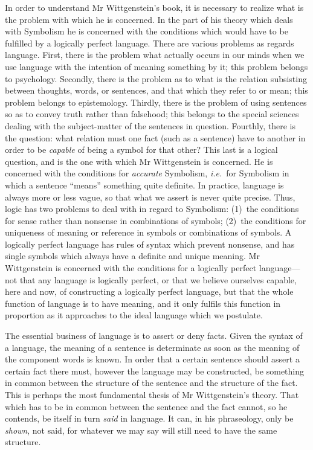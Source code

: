\documentclass[12pt,oneside]{book}[2007/10/19]
\newcommand{\idEst}{\textit{i.e.}}
\begin{document}
In order to understand Mr Wittgenstein's book, it is
necessary to realize what is the problem with which he is
concerned. In the part of his theory which deals with
Symbolism he is concerned with the conditions which
would have to be fulfilled by a logically perfect language.
There are various problems as regards language. First,
there is the problem what actually occurs in our minds
when we use language with the intention of meaning
something by it; this problem belongs to psychology.
Secondly, there is the problem as to what is the relation
subsisting between thoughts, words, or sentences, and that
which they refer to or mean; this problem belongs to
epistemology. Thirdly, there is the problem of using
sentences so as to convey truth rather than falsehood;
this belongs to the special sciences dealing with the
subject-matter of the sentences in question. Fourthly,
there is the question: what relation must one fact (such
as a sentence) have to another in order to be \emph{capable}
of being a symbol for that other? This last is a logical
question, and is the one with which Mr Wittgenstein is
concerned. He is concerned with the conditions for \emph{accurate}
Symbolism, \idEst\ for Symbolism in which a sentence
``means'' something quite definite. In practice, language
is always more or less vague, so that what we assert is
never quite precise. Thus, logic has two problems to deal
with in regard to Symbolism: (1)~the conditions for sense
rather than nonsense in combinations of symbols; (2)~the
conditions for uniqueness of meaning or reference in
symbols or combinations of symbols. A logically perfect
language has rules of syntax which prevent nonsense, and
has single symbols which always have a definite and
unique meaning. Mr Wittgenstein is concerned with the
conditions for a logically perfect language---not that any
language is logically perfect, or that we believe ourselves
capable, here and now, of constructing a logically perfect
language, but that the whole function of language is to
have meaning, and it only fulfils this function in proportion
as it approaches to the ideal language which we
postulate.

The essential business of language is to assert or
deny facts. Given the syntax of a language, the meaning
of a sentence is determinate as soon as the meaning of
the component words is known. In order that a certain
sentence should assert a certain fact there must, however
the language may be constructed, be something in common
between the structure of the sentence and the structure of
the fact. This is perhaps the most fundamental thesis
of Mr Wittgenstein's theory. That which has to be in
common between the sentence and the fact cannot, so
he contends, be itself in turn \emph{said} in language. It can,
in his phraseology, only be \emph{shown}, not said, for whatever
we may say will still need to have the same structure.
\end{document}

